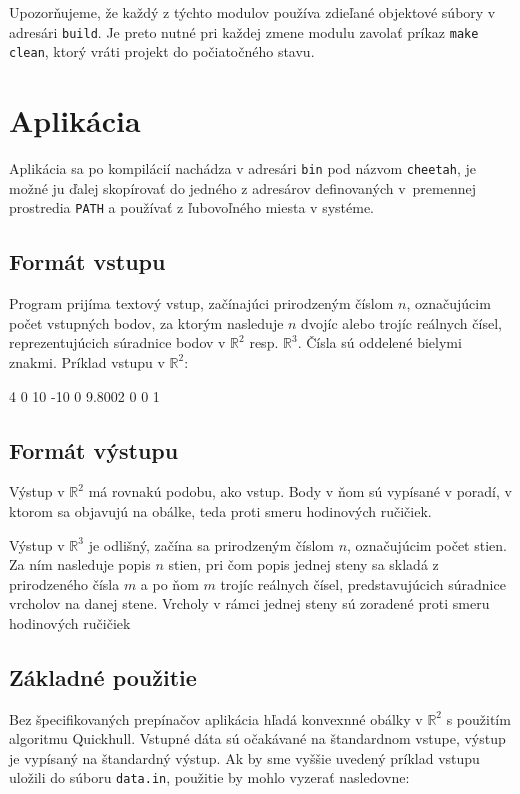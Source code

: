 \documentclass[a4paper, 12pt, slovak]{article}
\begin{document}
Upozorňujeme, že každý z týchto modulov používa zdieľané objektové súbory v adresári 
\texttt{build}. Je preto nutné pri každej zmene modulu zavolať príkaz \texttt{make 
clean}, ktorý vráti projekt do počiatočného stavu.

\section{Aplikácia}
Aplikácia sa po kompilácií nachádza v adresári \texttt{bin} pod názvom 
\texttt{cheetah}, je možné ju ďalej skopírovať do jedného z adresárov definovaných
v~premennej prostredia \texttt{PATH} a používať z ľubo\-voľ\-ného miesta v systéme.

\subsection{Formát vstupu}
Program prijíma textový vstup, začínajúci prirodzeným číslom $n$, označujúcim počet 
vstupných bodov, za ktorým nasleduje $n$ dvojíc alebo trojíc reálnych čísel, 
reprezentujúcich súradnice bodov v $\mathbb{R}^2$ resp. $\mathbb{R}^3$. Čísla 
sú oddelené bielymi znakmi. Príklad vstupu v $\mathbb{R}^2$:

\begin{c++}
4
0 10
-10 0
9.8002 0
0 1
\end{c++}

\subsection{Formát výstupu}
Výstup v $\mathbb{R}^2$ má rovnakú podobu, ako vstup. Body v ňom sú vypísané v 
poradí, v ktorom sa objavujú na obálke, teda proti smeru hodinových ručičiek. 

Výstup v $\mathbb{R}^3$ je odlišný, začína sa prirodzeným číslom $n$, označujúcim 
počet stien. Za ním nasleduje popis $n$ stien, pri čom popis jednej steny sa skladá 
z prirodzeného čísla $m$ a po ňom $m$ trojíc reálnych čísel, predstavujúcich 
súradnice vrcholov na danej stene. Vrcholy v rámci jednej steny sú zoradené proti 
smeru hodinových ručičiek

\subsection{Základné použitie}
Bez špecifikovaných prepínačov aplikácia hľadá konvexnné obálky v $\mathbb{R}^2$ s 
použitím algoritmu Quickhull. Vstupné dáta sú očakávané na štandardnom vstupe, výstup 
je vypísaný na štandardný výstup. Ak by sme vyššie uvedený príklad vstupu uložili do 
súboru \texttt{data.in}, použitie by mohlo vyzerať nasledovne:
\end{document}
